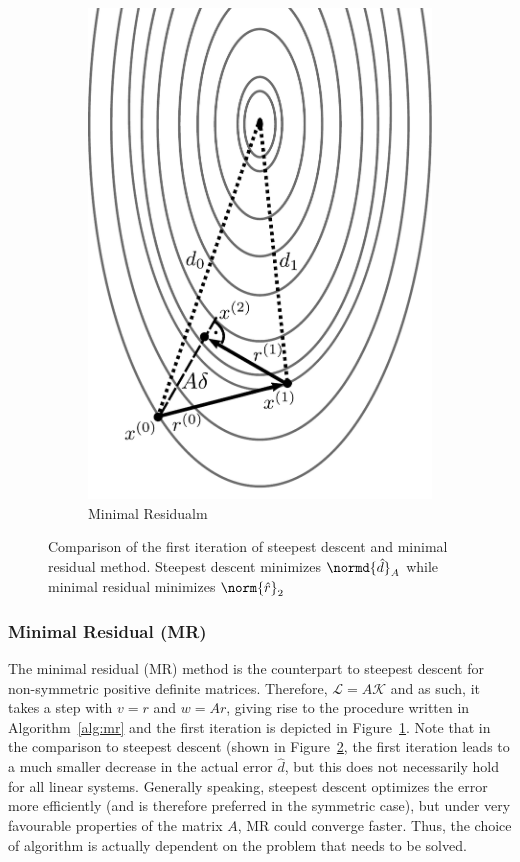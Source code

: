 \begin{figure}
\begin{subfigure}{.5\textwidth}
  \includegraphics[width=0.9\linewidth]{chapters/2_solvers/2_3_iterative_solvers/figures/mr.pdf}
  \caption{Minimal Residualm}
  \label{fig:mr}
\end{subfigure}
\caption{Comparison of the first iteration of steepest descent and minimal residual method. Steepest descent minimizes $\normd{\hat{d}}_A$ while minimal residual minimizes $\norm{\hat{r}}_2$}
\label{fig:one_d_projections}
\end{figure}


\subsubsection{Minimal Residual (MR)}
\label{sec:mr}
The minimal residual (MR) method is the counterpart to steepest descent for non-symmetric positive definite matrices. Therefore, $\mathcal{L}=A\mathcal{K}$ and as such, it takes a step with $v=r$ and $w=Ar$, giving rise to the procedure written in Algorithm~\hyperref[alg:mr]{\ref{alg:mr}} and the first iteration is depicted in Figure~\hyperref[fig:mr]{\ref{fig:mr}}. Note that in the comparison to steepest descent (shown in Figure~\hyperref[fig:one_d_projections]{\ref{fig:one_d_projections}}, the first iteration leads to a much smaller decrease in the actual error $\hat{d}$, but this does not necessarily hold for all linear systems. Generally speaking, steepest descent optimizes the error more efficiently (and is therefore preferred in the symmetric case), but under very favourable properties of the matrix $A$, MR could converge faster. Thus, the choice of algorithm is actually dependent on the problem that needs to be solved.

